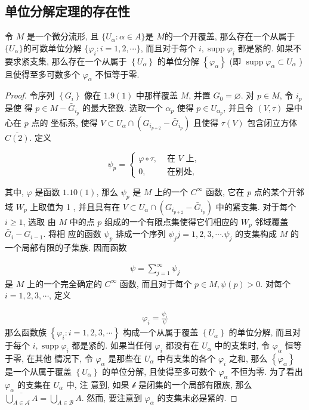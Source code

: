 \subsection{单位分解定理的存在性}
\begin{theorem}[][单位分解定理的存在性]
令 $M$ 是一个微分流形, 且 $\{U_\alpha \colon \alpha\in A\}$是 $M$的一个开覆盖, 那么存在一个从属于$\{U_\alpha\}$的可数单位分解 $\{\varphi_i\colon i=1,2,\cdots\}$,
而且对于每个 $i, \operatorname{supp} \varphi_i$ 都是紧的. 如果不要求紧支集, 那么存在一个从属于 $\left\{U_\alpha\right\}$ 的单位分解 $\left\{\varphi_\alpha\right\}$ (即 $\operatorname{supp} \varphi_\alpha \subset U_\alpha$ ) 且使得至多可数多个 $\varphi_\alpha$ 不恒等于零.
\end{theorem}
\begin{proof}
令序列 $\left\{G_i\right\}$ 像在 $1.9(1)$ 中那样覆盖 $M$, 并置 $G_0=\varnothing$. 对 $p \in M$, 令 $i_p$ 是使 得 $p \in M-\bar{G}_{i_p}$ 的最大整数. 选取一个 $\alpha_p$ 使得 $p \in U_{\alpha_p}$, 并且令 $(V, \tau)$ 是中心在 $p$ 点的 坐标系, 使得 $V \subset U_\alpha \cap\left(G_{i_{p+2}}-\bar{G}_{i_p}\right)$ 且使得 $\tau(V)$ 包含闭立方体 $\overline{C(2)}$. 定义

$$\psi_p= \begin{cases}\varphi \circ \tau, & \text { 在 } V \text { 上, } \\ 0, & \text { 在别处, }\end{cases}$$

其中, $\varphi$ 是函数 $1.10(1)$, 那么 $\psi_p$ 是 $M$ 上的一个 $C^{\infty}$ 函数, 它在 $p$ 点的某个开邻域 $W_p$ 上取值为 1 , 并且具有在 $V \subset U_\alpha \cap\left(G_{i_{p+2}}-\bar{G}_{i_p}\right)$ 中的紧支集. 对于每个 $i \geqslant 1$, 选取 由 $M$ 中的点 $p$ 组成的一个有限点集使得它们相应的 $W_p$ 邻域覆盖 $\bar{G}_i-G_{i-1}$. 将相 应的函数 $\psi_p$ 排成一个序列 $\psi_j j=1,2,3, \cdots . \psi_j$ 的支集构成 $M$ 的一个局部有限的子集族. 因而函数

\begin{align*}
\psi=\sum_{j=1}^{\infty} \psi_j
\end{align*}
是 $M$ 上的一个完全确定的 $C^{\infty}$ 函数, 而且对于每个 $p \in M, \psi(p)>0$. 对每个 $i=1,2,3, \cdots$, 定义

\begin{align*}
\varphi_i=\frac{\psi_i}{\psi}
\end{align*}
那么函数族 $\left\{\varphi_i: i=1,2,3, \cdots\right\}$ 构成一个从属于覆盖 $\left\{U_\alpha\right\}$ 的单位分解, 而且对于每个 $i, \operatorname{supp} \varphi_i$ 都是紧的. 如果当任何 $\varphi_i$ 都没有在 $U_\alpha$ 中的支集时, 令 $\varphi_\alpha$ 恒等于零, 在其他 情况下, 令 $\varphi_\alpha$ 是那些在 $U_\alpha$ 中有支集的各个 $\varphi_i$ 之和, 那么 $\left\{\varphi_\alpha\right\}$ 是一个从属于覆盖 $\left\{U_\alpha\right\}$ 的单位分解, 且使得至多可数个 $\varphi_\alpha$ 不恒为零. 为了看出 $\varphi_\alpha$ 的支集在 $U_\alpha$ 中, 注 意到, 如果 $\mathscr{b}$ 是闭集的一个局部有限族, 那么 $\overline{\bigcup_{A \in \mathscr{A}} A}=\bigcup_{A \in \mathscr{B}} A$. 然而, 要注意到 $\varphi_\alpha$ 的支集末必是紧的.
\end{proof}
